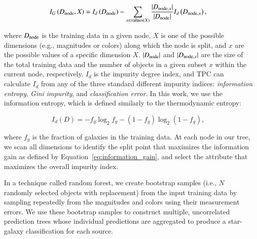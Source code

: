 \documentclass[fleqn,usenatbib]{mnras}
\newcommand{\eg}{{e.g., }}
\newcommand{\ie}{{i.e., }}
\begin{document}
\begin{equation} \label{eq:information_gain}
  I_G \left(D_{{\mathrm{node}}}, X\right)
  = I_d \left( D_{{\mathrm{node}}} \right)
  - \sum_{x \in {\mathrm{values}}(X)}
  \frac{|D_{{\mathrm{node}}, x}|}{|D_{{\mathrm{node}}}|}
  I_d \left( D_{{\mathrm{node}}, x} \right),
\end{equation}

\noindent
where $D_{{\mathrm{node}}}$ is the training data in a given node,
$X$ is one of the possible dimensions (\eg magnitudes or colors)
along which the node is split, and
$x$ are the possible values of a specific dimension $X$.
$|D_{{\mathrm{node}}}|$ and $|D_{{\mathrm{node}}, x}|$ are the size of the total training data
and the number of objects in a given subset $x$ within the current node,
respectively.
$I_d$ is the impurity degree index,
and TPC can calculate $I_d$
from any of the three standard different impurity indices:
\textit{information entropy}, \textit{Gini impurity},
and \textit{classification error}.
In this work, we use the information entropy,
which is defined similarly to the thermodynamic entropy:

\begin{equation}
  I_d \left( D \right)
  = - f_g \log_{2} f_g - \left(1 - f_g\right) \log_{2} \left(1 - f_g\right),
\end{equation}

\noindent
where $f_g$ is the fraction of galaxies in the training data.
At each node in our tree,
we scan all dimensions to identify the split point that
maximizes the information gain as defined by Equation~\ref{eq:information_gain},
and select the attribute that maximizes the overall impurity index.

In a technique called random forest,
we create bootstrap samples
(\ie $N$ randomly selected objects with replacement)
from the input training data
by sampling repeatedly from the magnitudes and colors
using their measurement errors.
We use these bootstrap samples to construct
multiple, uncorrelated prediction trees
whose individual predictions are aggregated to produce
a star-galaxy classification for each source.
\end{document}
